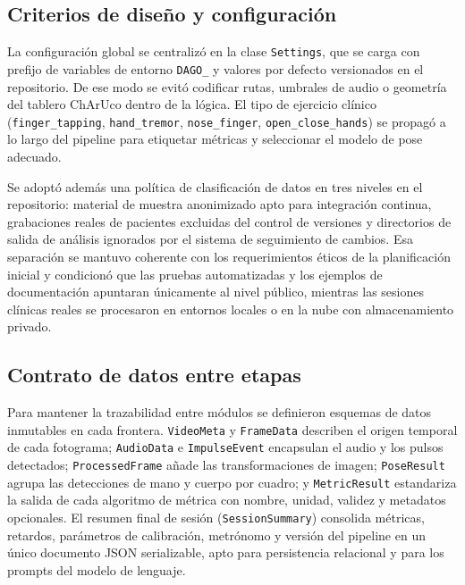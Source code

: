 \subsection{Criterios de diseño y configuración}

La configuración global se centralizó en la clase \texttt{Settings}, que se carga con prefijo de variables de entorno \texttt{DAGO\_} y valores por defecto versionados en el repositorio. De ese modo se evitó codificar rutas, umbrales de audio o geometría del tablero ChArUco dentro de la lógica. El tipo de ejercicio clínico (\texttt{finger\_tapping}, \texttt{hand\_tremor}, \texttt{nose\_finger}, \texttt{open\_close\_hands}) se propagó a lo largo del pipeline para etiquetar métricas y seleccionar el modelo de pose adecuado.

Se adoptó además una política de clasificación de datos en tres niveles en el repositorio: material de muestra anonimizado apto para integración continua, grabaciones reales de pacientes excluidas del control de versiones y directorios de salida de análisis ignorados por el sistema de seguimiento de cambios. Esa separación se mantuvo coherente con los requerimientos éticos de la planificación inicial y condicionó que las pruebas automatizadas y los ejemplos de documentación apuntaran únicamente al nivel público, mientras las sesiones clínicas reales se procesaron en entornos locales o en la nube con almacenamiento privado.

\subsection{Contrato de datos entre etapas}

Para mantener la trazabilidad entre módulos se definieron esquemas de datos inmutables en cada frontera. \texttt{VideoMeta} y \texttt{FrameData} describen el origen temporal de cada fotograma; \texttt{AudioData} e \texttt{ImpulseEvent} encapsulan el audio y los pulsos detectados; \texttt{ProcessedFrame} añade las transformaciones de imagen; \texttt{Pose\allowbreak{}Result} agrupa las detecciones de mano y cuerpo por cuadro; y \texttt{Metric\allowbreak{}Result} estandariza la salida de cada algoritmo de métrica con nombre, unidad, validez y metadatos opcionales. El resumen final de sesión (\texttt{Session\allowbreak{}Summary}) consolida métricas, retardos, parámetros de calibración, metrónomo y versión del pipeline en un único documento JSON serializable, apto para persistencia relacional y para los prompts del modelo de lenguaje.


